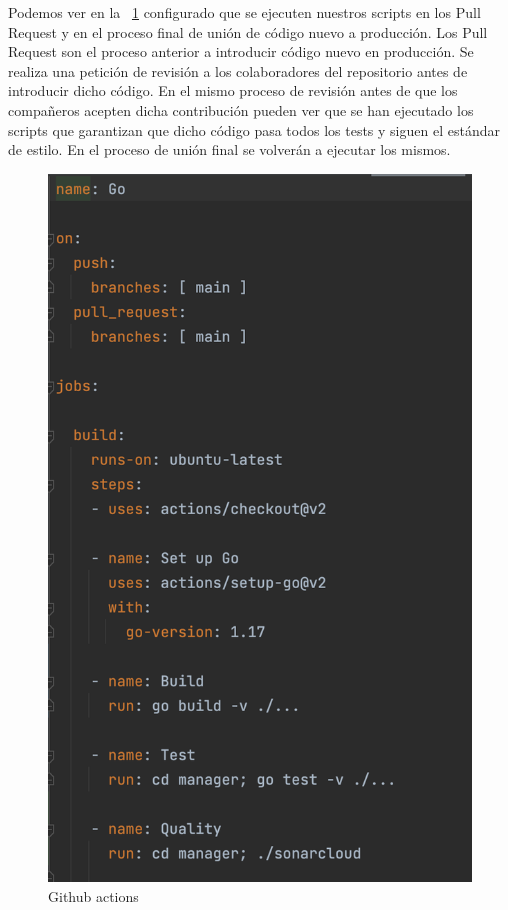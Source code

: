 Podemos ver en la ~\cref{fig:cicd} configurado que se ejecuten nuestros scripts en los Pull Request y en el proceso final de unión de código nuevo a producción.
Los Pull Request son el proceso anterior a introducir código nuevo en producción.
Se realiza una petición de revisión a los colaboradores del repositorio antes de introducir dicho código.
En el mismo proceso de revisión antes de que los compañeros acepten dicha contribución pueden ver que se han ejecutado los scripts que garantizan que dicho código pasa todos los tests y siguen el estándar de estilo.
En el proceso de unión final se volverán a ejecutar los mismos.

\begin{figure}[H]
    \centering
    \includegraphics[scale = 0.7]{part/Proyecto_ejecutivo/memoria_constructiva/cicd}
    \caption{Github actions}\label{fig:cicd}
\end{figure}